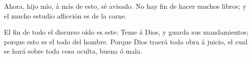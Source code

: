  Ahora, hijo mío, á más de esto, sé avisado. No hay fin
de hacer muchos libros; y el mucho estudio aflicción es de la carne.

 El fin de todo el discurso oído es este: Teme á Dios, y
guarda sus mandamientos; porque esto es el todo del hombre.
 Porque Dios traerá toda obra á juicio, el cual se hará
sobre toda cosa oculta, buena ó mala.
